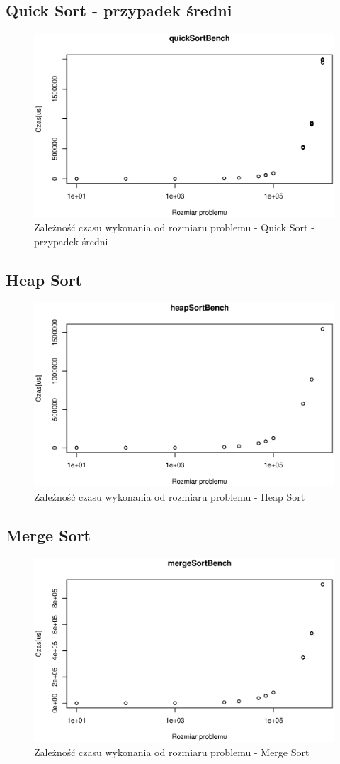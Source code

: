 \documentclass[10pt,a4paper]{article}
\begin{document}
\subsection{Quick Sort - przypadek średni}

\begin{figure}[H]
\centering
\includegraphics[width=0.7\linewidth]{./Wykresy/quickSortBench}
\caption{Zależność czasu wykonania od rozmiaru problemu - Quick Sort - przypadek średni}
\label{fig:quickSortBench}
\end{figure}

\subsection{Heap Sort}

\begin{figure}[H]
\centering
\includegraphics[width=0.7\linewidth]{./Wykresy/heapSortBench}
\caption{Zależność czasu wykonania od rozmiaru problemu - Heap Sort}
\label{fig:heapSortBench}
\end{figure}

\subsection{Merge Sort}

\begin{figure}[H]
\centering
\includegraphics[width=0.7\linewidth]{./Wykresy/mergeSortBench}
\caption{Zależność czasu wykonania od rozmiaru problemu - Merge Sort}
\label{fig:mergeSortBench}
\end{figure}
\end{document}
